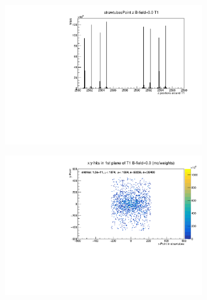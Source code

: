 \begin{frame}[t]{}
  \begin{figure}
    \centering
    \includegraphics[width=0.78\textwidth]{../hists/strawtubes/all/z_T1.pdf}
  \end{figure}
\end{frame}

\begin{frame}[t]{}
  \begin{figure}
    \centering
    \includegraphics[width=0.78\textwidth]{../hists/strawtubes/all/xy_0.pdf}
  \end{figure}
\end{frame}

